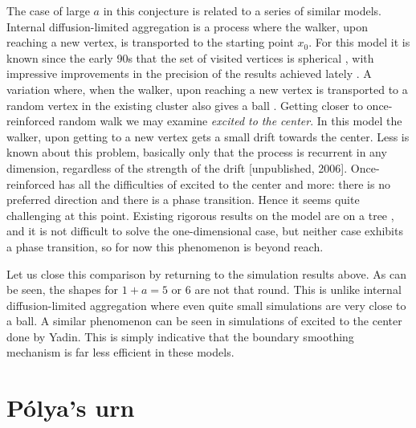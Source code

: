 \documentclass{emsprocart}
\theoremstyle{plain}
\begin{document}
The case of large $a$ in this conjecture is related to a series of
similar models. Internal diffusion-limited aggregation is a process
where the walker, upon reaching a new vertex, is transported to the
starting point $x_{0}$. For this model it is known since the early
90s that the set of visited vertices is spherical \cite{LBG92,L95},
with impressive improvements in the precision of the results achieved
lately \cite{JLS12,JLS11,AG11}. A variation where, when the walker,
upon reaching a new vertex is transported to a random vertex in the
existing cluster also gives a ball \cite{BDCKL}. Getting closer to
once-reinforced random walk we may examine \emph{excited to the center}.
In this model the walker, upon getting to a new vertex gets a small
drift towards the center. Less is known about this problem, basically
only that the process is recurrent in any dimension, regardless of
the strength of the drift {[}unpublished, 2006{]}. Once-reinforced
has all the difficulties of excited to the center and more: there
is no preferred direction and there is a phase transition. Hence it
seems quite challenging at this point. Existing rigorous results on
the model are on a tree \cite{DKL02}, and it is not difficult to
solve the one-dimensional case, but neither case exhibits a phase
transition, so for now this phenomenon is beyond reach.

Let us close this comparison by returning to the simulation results
above. As can be seen, the shapes for $1+a=5$ or $6$ are not that
round. This is unlike internal diffusion-limited aggregation where
even quite small simulations are very close to a ball. A similar phenomenon
can be seen in simulations of excited to the center done by Yadin.
This is simply indicative that the boundary smoothing mechanism is
far less efficient in these models.

\section{P\'olya's urn}
\end{document}
